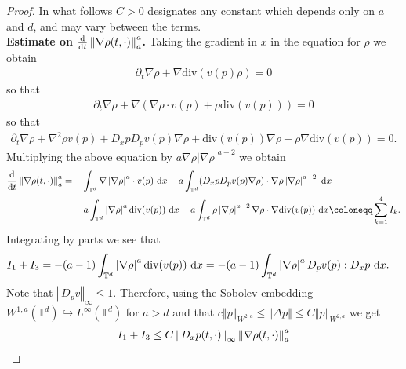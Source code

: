 \documentclass[11pt,reqno]{amsart}
\numberwithin{equation}{section}
\def\dd{{\rm d}}
\begin{document}
\begin{proof}
In what follows $C>0$ designates any constant which depends only on $a$ and $d$, and may vary between the terms. \\ 
\textbf{Estimate on $\frac{\dd}{\dd t}\left\Vert \nabla \rho(t,\cdot)\right\Vert_{a}^{a}$.} Taking the gradient in $x$ in the equation for $\rho$ we  obtain  
\begin{align*}
\partial_{t}\nabla\rho+\nabla\mathrm{div}(v(p)\rho)=0    
\end{align*}
so that 
\begin{align*}
\partial_{t}\nabla\rho+\nabla(\nabla\rho \cdot v(p)+\rho \mathrm{div}(v(p)))=0 \end{align*}
so that 
\begin{align*}
\partial_{t}\nabla\rho +\nabla^{2}\rho v(p)+D_{x}pD_{p}v(p)\nabla\rho +\mathrm{div}(v(p))\nabla\rho +\rho\nabla \mathrm{div}(v(p))=0.   
\end{align*}
Multiplying the above equation by $a\nabla\rho \left\vert \nabla\rho\right\vert^{a-2} $ we obtain 
\begin{align*}
\frac{\dd}{\dd t}\left\Vert \nabla \rho(t,\cdot)\right\Vert_{a}^{a}=&-\int_{\mathbb{T}^{d}} \nabla\left\vert \nabla \rho\right\vert^{a}\cdot v(p)\ \dd x-a\int_{\mathbb{T}^{d}}  (D_{x}pD_{p}v(p)\nabla \rho)\cdot\nabla \rho \left\vert \nabla \rho\right\vert^{a-2}\ \dd x\\
&-a\int_{\mathbb{T}^{d}} \left\vert \nabla \rho\right\vert^{a}\mathrm{div}(v(p))\ \dd x-a\int_{\mathbb{T}^{d}} \rho \left\vert \nabla \rho\right\vert^{a-2} \nabla \rho\cdot \nabla \mathrm{div}(v(p))\ \dd x\coloneqq\sum_{k=1}^{4}I_{k}.  \end{align*}
Integrating by parts we see that 
\begin{align*}
I_{1}+I_{3}&=-(a-1)\int_{\mathbb{T}^{d}} \left\vert \nabla \rho\right\vert^{a}\mathrm{div}(v(p))\ \dd x=-(a-1)\int_{\mathbb{T}^{d}} \left\vert \nabla \rho\right\vert^{a}D_{p}v(p):D_{x}p\ \dd x.  
\end{align*}
Note that $\left\Vert D_{p}v \right\Vert_{\infty}\leq 1 $. Therefore, using the Sobolev embedding $W^{1,a}(\mathbb{T}^{d})\hookrightarrow L^{\infty}(\mathbb{T}^{d})$ for $a>d$  and that $c\left\Vert p\right\Vert_{W^{2,a}} \leq \left\Vert \Delta p\right\Vert\leq C\left\Vert p\right\Vert_{W^{2,a}}  $ we get   
\begin{align}
I_{1}+I_{3}&\leq C\left\Vert D_{x}p(t,\cdot)\right\Vert_{\infty} \left\Vert \nabla \rho(t,\cdot)\right\Vert_{a}^{a} \notag\\

\end{align}
\end{proof}
\end{document}
